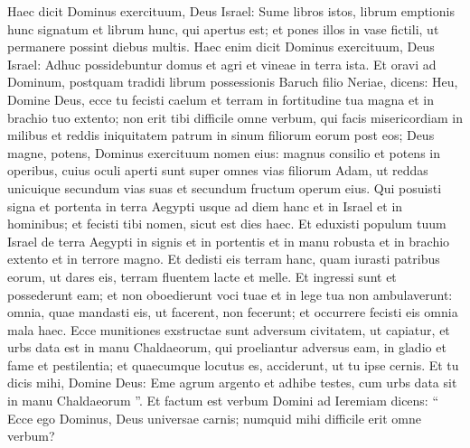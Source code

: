 \begin{biblechapter}
\begin{biblechapter}
\begin{biblechapter}
\begin{biblechapter}
\begin{biblechapter}
\begin{biblechapter}
\begin{biblechapter}
\begin{biblechapter}
\begin{biblechapter}
\begin{biblechapter}
\begin{biblechapter}
\begin{biblechapter}
\begin{biblechapter}
\begin{biblechapter}
\begin{biblechapter}
\begin{biblechapter}
\begin{biblechapter}
\begin{biblechapter}
\begin{biblechapter}
\begin{biblechapter}
\begin{biblechapter}
\begin{biblechapter}
\begin{biblechapter}
\begin{biblechapter}
\begin{biblechapter}
\begin{biblechapter}
\begin{biblechapter}
\begin{biblechapter}
\begin{biblechapter}
\begin{biblechapter}
\begin{biblechapter}
\begin{biblechapter}
 \verse Haec dicit Dominus exercituum, Deus Israel: Sume libros istos, librum emptionis hunc signatum et librum hunc, qui apertus est; et pones illos in vase fictili, ut permanere possint diebus multis. 
\verse Haec enim dicit Dominus exercituum, Deus Israel: Adhuc possidebuntur domus et agri et vineae in terra ista.
 \verse Et oravi ad Dominum, postquam tradidi librum possessionis Baruch filio Neriae, dicens: 
\verse Heu, Domine Deus, ecce tu fecisti caelum et terram in fortitudine tua magna et in brachio tuo extento; non erit tibi difficile omne verbum, 
\verse qui facis misericordiam in milibus et reddis iniquitatem patrum in sinum filiorum eorum post eos; Deus magne, potens, Dominus exercituum nomen eius: 
\verse magnus consilio et potens in operibus, cuius oculi aperti sunt super omnes vias filiorum Adam, ut reddas unicuique secundum vias suas et secundum fructum operum eius. 
\verse Qui posuisti signa et portenta in terra Aegypti usque ad diem hanc et in Israel et in hominibus; et fecisti tibi nomen, sicut est dies haec. 
\verse Et eduxisti populum tuum Israel de terra Aegypti in signis et in portentis et in manu robusta et in brachio extento et in terrore magno. 
\verse Et dedisti eis terram hanc, quam iurasti patribus eorum, ut dares eis, terram fluentem lacte et melle. 
\verse Et ingressi sunt et possederunt eam; et non oboedierunt voci tuae et in lege tua non ambulaverunt: omnia, quae mandasti eis, ut facerent, non fecerunt; et occurrere fecisti eis omnia mala haec. 
\verse Ecce munitiones exstructae sunt adversum civitatem, ut capiatur, et urbs data est in manu Chaldaeorum, qui proeliantur adversus eam, in gladio et fame et pestilentia; et quaecumque locutus es, acciderunt, ut tu ipse cernis. 
 \verse Et tu dicis mihi, Domine Deus: Eme agrum argento et adhibe testes, cum urbs data sit in manu Chaldaeorum ”.
 \verse Et factum est verbum Domini ad Ieremiam dicens: 
\verse “ Ecce ego Dominus, Deus universae carnis; numquid mihi difficile erit omne verbum? 

\end{biblechapter}
\end{biblechapter}
\end{biblechapter}
\end{biblechapter}
\end{biblechapter}
\end{biblechapter}
\end{biblechapter}
\end{biblechapter}
\end{biblechapter}
\end{biblechapter}
\end{biblechapter}
\end{biblechapter}
\end{biblechapter}
\end{biblechapter}
\end{biblechapter}
\end{biblechapter}
\end{biblechapter}
\end{biblechapter}
\end{biblechapter}
\end{biblechapter}
\end{biblechapter}
\end{biblechapter}
\end{biblechapter}
\end{biblechapter}
\end{biblechapter}
\end{biblechapter}
\end{biblechapter}
\end{biblechapter}
\end{biblechapter}
\end{biblechapter}
\end{biblechapter}
\end{biblechapter}
